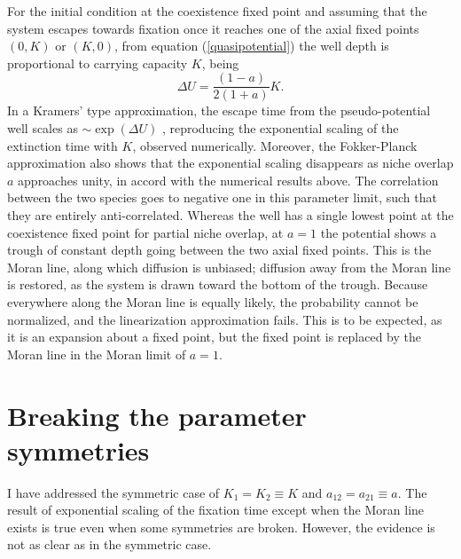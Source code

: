 For the initial condition at the coexistence fixed point and assuming that the system escapes towards fixation once it reaches one of the axial fixed points $(0,K)$ or $(K,0)$, from equation (\ref{quasipotential}) the well depth is proportional to carrying capacity $K$, being
\begin{equation}
\Delta U = \frac{(1-a)}{2(1+a)}K.
\end{equation}
In a Kramers' type approximation, the escape time from the pseudo-potential well scales as $\sim \exp(\Delta U)$ \cite{Hanggi1990}, reproducing the exponential scaling of the extinction time with $K$, observed numerically.  Moreover, the Fokker-Planck approximation also shows that the exponential scaling disappears as niche overlap $a$ approaches unity, in accord with the numerical results above. 
The correlation between the two species goes to negative one in this parameter limit, such that they are entirely anti-correlated. 
Whereas the well has a single lowest point at the coexistence fixed point for partial niche overlap, at $a=1$ the potential shows a trough of constant depth going between the two axial fixed points. 
This is the Moran line, along which diffusion is unbiased; diffusion away from the Moran line is restored, as the system is drawn toward the bottom of the trough. 
Because everywhere along the Moran line is equally likely, the probability cannot be normalized, and the linearization approximation fails. This is to be expected, as it is an expansion about a fixed point, but the fixed point is replaced by the Moran line in the Moran limit of $a=1$. 


\section{Breaking the parameter symmetries} \label{asymmetricsection}
I have addressed the symmetric case of $K_1 = K_2 \equiv K$ and $a_{12} = a_{21} \equiv a$. 
The result of exponential scaling of the fixation time except when the Moran line exists is true even when some symmetries are broken. 
However, the evidence is not as clear as in the symmetric case. 

